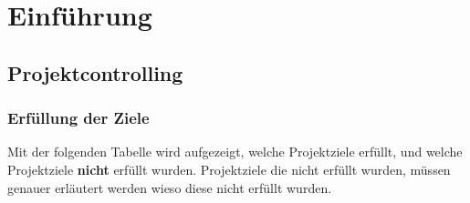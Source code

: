 \chapter{Einführung}\label{AppendixEinführung}

\section{Projektcontrolling}

\subsection{Erfüllung der Ziele}

Mit der folgenden Tabelle wird aufgezeigt, welche Projektziele erfüllt,
und welche Projektziele \textbf{nicht} erfüllt wurden. Projektziele die nicht
erfüllt wurden, müssen genauer erläutert werden wieso diese nicht erfüllt wurden.

